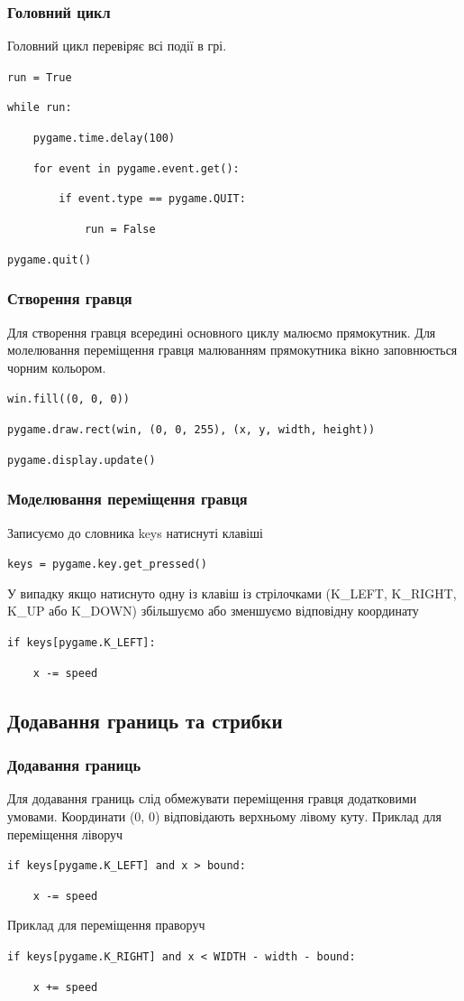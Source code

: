 \begin{frame}
\frametitle{Головний цикл}

Головний цикл перевіряє всі події в грі. 

\vspace{0.5cm}

\texttt{run = True}

\texttt{while run:}

\texttt{~~~~pygame.time.delay(100)}

\texttt{~~~~for event in pygame.event.get():}

\texttt{~~~~~~~~if event.type == pygame.QUIT:}

\texttt{~~~~~~~~~~~~run = False}

\texttt{pygame.quit()}
\end{frame}

\begin{frame}
\frametitle{Створення гравця}

Для створення гравця всередині основного циклу малюємо прямокутник. Для молелювання переміщення гравця малюванням прямокутника вікно заповнюється чорним кольором.

\texttt{win.fill((0, 0, 0))}

\texttt{pygame.draw.rect(win, (0, 0, 255), (x, y, width, height))}

\texttt{pygame.display.update()}
\end{frame}

\begin{frame}
\frametitle{Моделювання переміщення гравця}
Записуємо до словника keys натиснуті клавіші

\texttt{keys = pygame.key.get\_pressed()}

У випадку якщо натиснуто одну із клавіш із стрілочками (K\_LEFT, K\_RIGHT, K\_UP або K\_DOWN) збільшуємо або зменшуємо відповідну координату 

\texttt{if keys[pygame.K\_LEFT]:}

\texttt{~~~~x -= speed}
\end{frame}

\subsection{Додавання границь та стрибки}
\begin{frame}
\frametitle{Додавання границь}
Для додавання границь слід обмежувати переміщення гравця додатковими умовами. Координати (0, 0) відповідають верхньому лівому куту. Приклад для переміщення ліворуч 

\texttt{if keys[pygame.K\_LEFT] and x > bound:}

\texttt{~~~~x -= speed}

Приклад для переміщення праворуч

\texttt{if keys[pygame.K\_RIGHT] and x < WIDTH - width - bound:}

\texttt{~~~~x += speed}
\end{frame}

